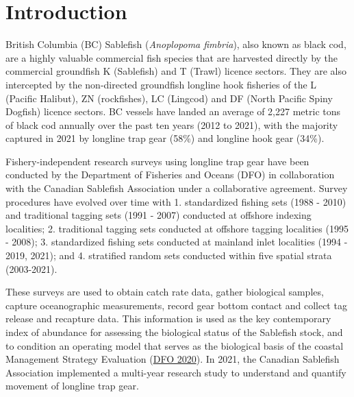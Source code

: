\documentclass[12pt]{article}\usepackage[]{graphicx}\usepackage[]{color}
\begin{document}

\frontmatter


\renewcommand{\headrulewidth}{0.5pt}  %
\renewcommand{\footrulewidth}{0.5pt}  %

\newcommand{\lt}{\ensuremath <}
\newcommand{\gt}{\ensuremath >}

\newlength{\cslhangindent}
\setlength{\cslhangindent}{1.5em}
\newenvironment{cslreferences}%
  {}%
  {\par}

\hypertarget{sec:introduction}{%
\section{Introduction}\label{sec:introduction}}

British Columbia (BC) Sablefish (\emph{Anoplopoma fimbria}), also known as black cod, are a highly valuable commercial fish species that are harvested directly by the commercial groundfish K (Sablefish) and T (Trawl) licence sectors. They are also intercepted by the non-directed groundfish longline hook fisheries of the L (Pacific Halibut), ZN (rockfishes), LC (Lingcod) and DF (North Pacific Spiny Dogfish) licence sectors. BC vessels have landed an average of 2,227 metric tons of black cod annually over the past ten years (2012 to 2021), with the majority captured in 2021 by longline trap gear (58\%) and longline hook gear (34\%).

Fishery-independent research surveys using longline trap gear have been conducted by the Department of Fisheries and Oceans (DFO) in collaboration with the Canadian Sablefish Association under a collaborative agreement. Survey procedures have evolved over time with 1. standardized fishing sets (1988 - 2010) and traditional tagging sets (1991 - 2007) conducted at offshore indexing localities; 2. traditional tagging sets conducted at offshore tagging localities (1995 - 2008); 3. standardized fishing sets conducted at mainland inlet localities (1994 - 2019, 2021); and 4. stratified random sets conducted within five spatial strata (2003-2021).

These surveys are used to obtain catch rate data, gather biological samples, capture oceanographic measurements, record gear bottom contact and collect tag release and recapture data. This information is used as the key contemporary index of abundance for assessing the biological status of the Sablefish stock, and to condition an operating model that serves as the biological basis of the coastal Management Strategy Evaluation (\protect\hyperlink{ref-DFO2020}{DFO 2020}). In 2021, the Canadian Sablefish Association implemented a multi-year research study to understand and quantify movement of longline trap gear.
\end{document}
